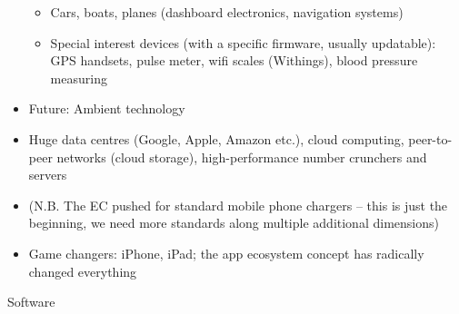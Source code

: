 \documentclass[10pt, plain]{../../metanetpaper}
\begin{document}
\begin{multicols}{2}
\begin{itemize}
\begin{itemize}
  \item Cars, boats, planes (dashboard electronics, navigation systems)
  \item Special interest devices (with a specific firmware, usually updatable): GPS handsets, pulse meter, wifi scales (Withings), blood pressure measuring
  \end{itemize}
\item Future: Ambient technology
\item Huge data centres (Google, Apple, Amazon etc.), cloud computing, peer-to-peer networks (cloud storage), high-performance number crunchers and servers
\item (N.B. The EC pushed for standard mobile phone chargers – this is just the beginning, we need more standards along multiple additional dimensions)
\item Game changers: iPhone, iPad; the app ecosystem concept has radically changed everything
\end{itemize}

Software


\end{multicols}
\end{document}
